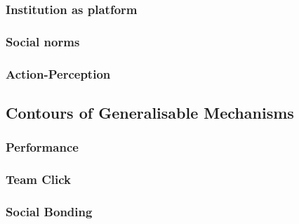     \subsubsection{Institution as platform}

    \subsubsection{Social norms}

    \subsubsection{Action-Perception}



  \subsection{Contours of Generalisable Mechanisms}

  \subsubsection{Performance}


  \subsubsection{Team Click}

  \subsubsection{Social Bonding}

